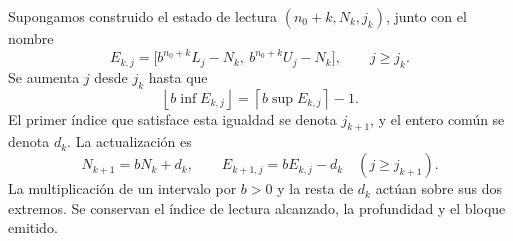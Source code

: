 Supongamos construido el estado de lectura \((n_0+k,N_k,j_k)\), junto
con el nombre
\begin{equation}
 E_{k,j}=
 \bigl[b^{n_0+k}L_j-N_k,\ b^{n_0+k}U_j-N_k\bigr],
 \qquad j\geq j_k.
 \label{eq:residual-nombre-k}
\end{equation}
Se aumenta \(j\) desde \(j_k\) hasta que
\[
 \left\lfloor b\inf E_{k,j}\right\rfloor
 =\left\lceil b\sup E_{k,j}\right\rceil-1.
\]
El primer índice que satisface esta igualdad se denota \(j_{k+1}\), y el
entero común se denota \(d_k\). La actualización es
\begin{equation}
 N_{k+1}=bN_k+d_k,
 \qquad E_{k+1,j}=bE_{k,j}-d_k
 \quad(j\geq j_{k+1}).
 \label{eq:residual-actualizacion-exacta}
\end{equation}
La multiplicación de un intervalo por \(b>0\) y la resta de \(d_k\)
actúan sobre sus dos extremos. Se conservan el índice de lectura alcanzado,
la profundidad y el bloque emitido.


